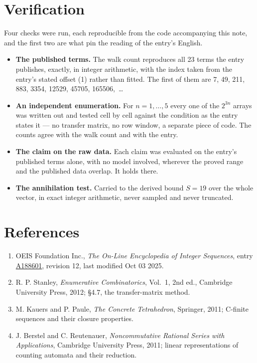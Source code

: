 \documentclass[11pt]{article}
\theoremstyle{definition}
\begin{document}
\section{Verification}

Four checks were run, each reproducible from the code accompanying this note, and the first two are what pin the reading of the entry's English.

\begin{itemize}

\item {\bfseries The published terms.} The walk count reproduces all 23 terms the entry publishes, exactly, in integer arithmetic, with the index taken from the entry's stated offset (1) rather than fitted. The first of them are 7, 49, 211, 883, 3354, 12529, 45705, 165506,~\dots

\item {\bfseries An independent enumeration.} For $n = 1,\dots,5$ every one of the $2^{3n}$ arrays was written out and tested cell by cell against the condition as the entry states it --- no transfer matrix, no row window, a separate piece of code. The counts agree with the walk count and with the entry.

\item {\bfseries The claim on the raw data.} Each claim was evaluated on the entry's published terms alone, with no model involved, wherever the proved range and the published data overlap. It holds there.

\item {\bfseries The annihilation test.} Carried to the derived bound $S = 19$ over the whole vector, in exact integer arithmetic, never sampled and never truncated.

\end{itemize}

\section{References}

\begin{enumerate}

\item OEIS Foundation Inc., \emph{The On-Line Encyclopedia of Integer Sequences}, entry \href{https://oeis.org/A188601}{A188601}, revision 12, last modified Oct 03 2025.

\item R. P. Stanley, \emph{Enumerative Combinatorics}, Vol.~1, 2nd ed., Cambridge University Press, 2012; \S4.7, the transfer-matrix method.

\item M. Kauers and P. Paule, \emph{The Concrete Tetrahedron}, Springer, 2011; C-finite sequences and their closure properties.

\item J. Berstel and C. Reutenauer, \emph{Noncommutative Rational Series with Applications}, Cambridge University Press, 2011; linear representations of counting automata and their reduction.

\end{enumerate}
\end{document}
